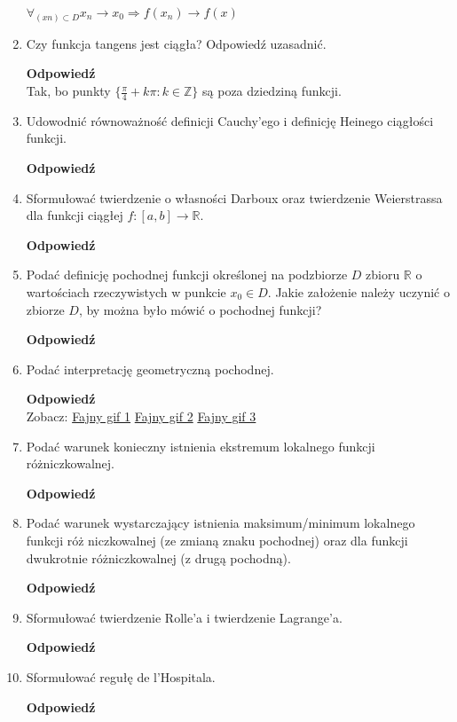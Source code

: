 \documentclass[12pt,a4paper]{article}
\newcounter{twierdzenie}
\theoremstyle{break}
\newcommand{\Odp}[1]{
		\begin{mdframed}[style=zadanie]
			\textbf{Odpowiedź}\\
			#1
		\end{mdframed}
	}
\begin{document}
\begin{enumerate}[1.]
{		$\forall_{(xn)\subset D} x_n\rightarrow x_0 \Rightarrow f(x_n)\rightarrow f(x)$
		
		
	}
	
	\item Czy funkcja tangens jest ciągła? Odpowiedź uzasadnić.
	\Odp{
		Tak, bo punkty $\{\frac{\pi}{4}+k\pi:k\in\mathbb{Z}\}$ są poza dziedziną funkcji.
	}
	
	\item Udowodnić równoważność definicji Cauchy’ego i definicję Heinego ciągłości funkcji.
	\Odp{
		
	}
	
	\item Sformułować twierdzenie o własności Darboux oraz twierdzenie Weierstrassa dla funkcji ciągłej $f : [a, b] \rightarrow \mathbb{R}$.
	\Odp{
	
	}
	
	\item Podać definicję pochodnej funkcji określonej na podzbiorze $D$ zbioru $\mathbb{R}$ o wartościach rzeczywistych w punkcie $x_0 \in D$. Jakie założenie należy uczynić o zbiorze $D$, by można było mówić o pochodnej funkcji?
	\Odp{

	}
	
	\item Podać interpretację geometryczną pochodnej.
	\Odp{
		Zobacz: \href{https://tenor.com/view/limite-math-y-axis-x-axis-calculus-gif-14990687}{Fajny gif 1}\hspace{1cm}
		\href{https://tenor.com/view/derivative-gif-23137892}{Fajny gif 2}\hspace{1cm}
		\href{https://tenor.com/view/derivada-gif-22383091}{Fajny gif 3}
	}
	
	\item Podać warunek konieczny istnienia ekstremum lokalnego funkcji różniczkowalnej.
	\Odp{
		
	}
	
	\item Podać warunek wystarczający istnienia maksimum/minimum lokalnego funkcji róż	niczkowalnej (ze zmianą znaku pochodnej) oraz dla funkcji dwukrotnie różniczkowalnej (z drugą pochodną).
	\Odp{
	
	}
	
	\item Sformułować twierdzenie Rolle’a i twierdzenie Lagrange’a.
	\Odp{
	
	}
	
	\item Sformułować regułę de l’Hospitala.
	\Odp{
	
}
\end{enumerate}
\end{document}
